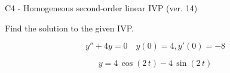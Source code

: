 \begin{exercise}
  \begin{exerciseTitle}C4 - Homogeneous second-order linear IVP (ver. 14)\end{exerciseTitle}
  \begin{exerciseStatement}
    
Find the solution to the given IVP.

    
\[y''+4y = 0 \hspace{1em} y(0) = 4 , y'(0) = -8\]

  \end{exerciseStatement}
  \begin{exerciseAnswer}
    
\[y= 4 \, \cos\left(2 \, t\right) - 4 \, \sin\left(2 \, t\right)\]

  \end{exerciseAnswer}
\end{exercise}